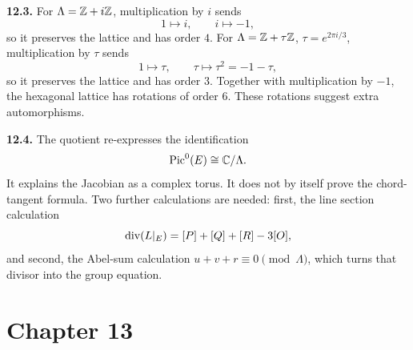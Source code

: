 \textbf{12.3.} For \(\Lambda=\mathbb{Z}+i\mathbb{Z}\), multiplication by \(i\) sends
\[
  1\mapsto i,\qquad i\mapsto -1,
\]
so it preserves the lattice and has order \(4\).  For
\(\Lambda=\mathbb{Z}+\tau\mathbb{Z}\), \(\tau=e^{2\pi i/3}\), multiplication by \(\tau\) sends
\[
  1\mapsto \tau,\qquad \tau\mapsto \tau^2=-1-\tau,
\]
so it preserves the lattice and has order \(3\).  Together with multiplication
by \(-1\), the hexagonal lattice has rotations of order \(6\).  These rotations
suggest extra automorphisms.

\begin{center}
\end{center}

\textbf{12.4.} The quotient re-expresses the identification
\[
  \operatorname{Pic}^0(E)\cong\mathbb{C}/\Lambda.
\]
It explains the Jacobian as a complex torus.  It does not by itself prove the
chord-tangent formula.  Two further calculations are needed: first, the line
section calculation
\[
  \operatorname{div}(L|_E)=[P]+[Q]+[R]-3[O],
\]
and second, the Abel-sum calculation \(u+v+r\equiv0\pmod{\Lambda}\), which turns
that divisor into the group equation.

\begin{center}
\end{center}

\section{Chapter 13}


